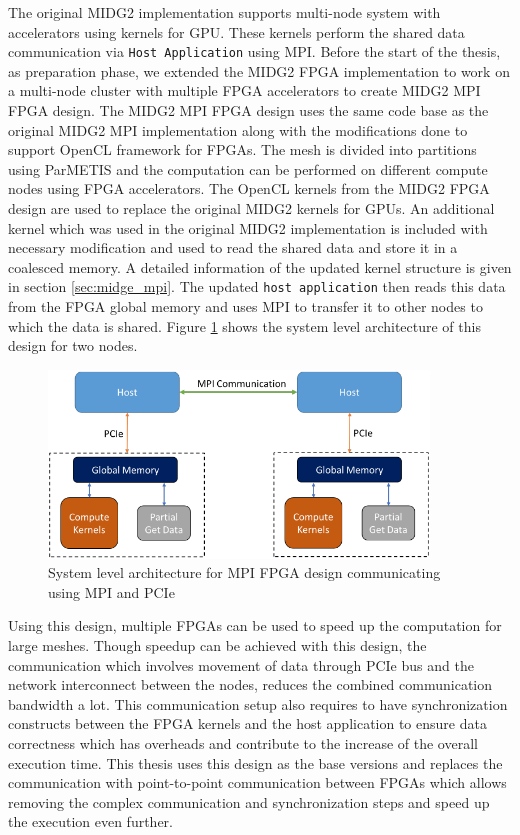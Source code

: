 The original MIDG2 implementation supports multi-node system with accelerators using
kernels for GPU. These kernels perform the shared data communication via \texttt{Host Application}
using MPI. Before the start of the thesis, as preparation phase, we extended the MIDG2 FPGA
implementation to work on a multi-node cluster with multiple FPGA accelerators to create MIDG2 MPI FPGA design.
The MIDG2 \ac{MPI} FPGA design uses the same code base as the original MIDG2 \ac{MPI} implementation
along with the modifications done to support OpenCL framework for FPGAs.
The mesh is divided into partitions using ParMETIS and the computation can be performed on different
compute nodes using FPGA accelerators. The OpenCL kernels from the MIDG2 FPGA design are used to replace
the original MIDG2 kernels for GPUs. An additional kernel which was used in the original MIDG2
implementation is included with necessary modification and used to read the shared data and store it in a coalesced
memory. A detailed information of the updated kernel structure is given in section \ref{sec:midge_mpi}.
The updated \texttt{host application} then reads this data from the FPGA global memory and uses
\ac{MPI} to transfer it to other nodes to which the data is shared. Figure
\ref{fig:mpi_fpga} shows the system level architecture of this design for two nodes.
\begin{figure}[ht]%
    \centering
    \includegraphics[width=0.9\textwidth]{images/mpi_fpga}
    \caption{System level architecture for MPI FPGA design communicating using MPI and PCIe}
    \label{fig:mpi_fpga}
\end{figure}

Using this design, multiple FPGAs can be used to speed up the computation for large meshes.
Though speedup can be achieved with this design, the communication which involves
movement of data through PCIe bus and the network interconnect between the nodes,
reduces the combined communication bandwidth a lot. This communication setup also
requires to have synchronization constructs between the FPGA kernels and the host
application to ensure data correctness which has overheads and contribute to the increase
of the overall execution time. This thesis uses this design as the base versions and replaces
the communication with point-to-point communication between FPGAs which allows
removing the complex communication and synchronization steps and speed up the
execution even further.


